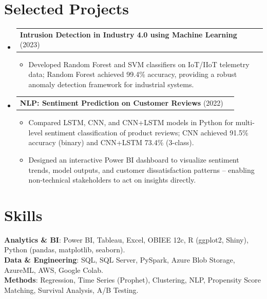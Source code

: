 \documentclass[letterpaper,10.9pt]{article}
\makeatletter
\newcommand{\resumeItem}[1]{
  \item\small{{#1 \vspace{-5pt}}}
}
\newcommand{\resumeProjectHeading}[2]{
    \item
    \begin{tabular*}{0.97\textwidth}{l@{\extracolsep{\fill}}r}
      \small#1 & #2 \\
    \end{tabular*}\vspace{-7pt}
}
\newcommand{\resumeSubHeadingListStart}{\begin{itemize}[leftmargin=0.15in, label={}]}
\newcommand{\resumeSubHeadingListEnd}{\end{itemize}}
\newcommand{\resumeItemListStart}{\begin{itemize}}
\newcommand{\resumeItemListEnd}{\end{itemize}\vspace{-5pt}}
\makeatother
\begin{document}
\section{Selected Projects}
    \resumeSubHeadingListStart
\resumeProjectHeading
{\textbf{Intrusion Detection in Industry 4.0 using Machine Learning} {(2023)}}{}
\resumeItemListStart
  \resumeItem{Developed Random Forest and SVM classifiers on IoT/IIoT telemetry data; Random Forest achieved 99.4\% accuracy, providing a robust anomaly detection framework for industrial systems.}
\resumeItemListEnd
\resumeProjectHeading
{\textbf{NLP: Sentiment Prediction on Customer Reviews} {(2022)}}{}
\resumeItemListStart
  \resumeItem{Compared LSTM, CNN, and CNN+LSTM models in Python for multi-level sentiment classification of product reviews; CNN achieved 91.5\% accuracy (binary) and CNN+LSTM 73.4\% (3-class).}
  \resumeItem{Designed an interactive Power BI dashboard to visualize sentiment trends, model outputs, and customer dissatisfaction patterns -- enabling non-technical stakeholders to act on insights directly.}
\resumeItemListEnd
    \resumeSubHeadingListEnd

\section{Skills}
 \begin{itemize}[leftmargin=0.15in, label={}]
    \small{\item{
    \textbf{Analytics \& BI}{: Power BI, Tableau, Excel, OBIEE 12c, R (ggplot2, Shiny), Python (pandas, matplotlib, seaborn).}\\
    \textbf{Data \& Engineering}{: SQL, SQL Server, PySpark, Azure Blob Storage, AzureML, AWS, Google Colab.}\\
    \textbf{Methods}{: Regression, Time Series (Prophet), Clustering, NLP, Propensity Score Matching, Survival Analysis, A/B Testing.}
    }}
 \end{itemize}
\end{document}
